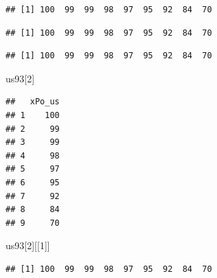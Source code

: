 \documentclass[
]{article}
\newenvironment{Shaded}{\begin{snugshade}}{\end{snugshade}}
\newcommand{\DecValTok}[1]{\textcolor[rgb]{0.00,0.00,0.81}{#1}}
\newcommand{\NormalTok}[1]{#1}
\newcommand{\SpecialCharTok}[1]{\textcolor[rgb]{0.00,0.00,0.00}{#1}}
\newcommand{\StringTok}[1]{\textcolor[rgb]{0.31,0.60,0.02}{#1}}
\begin{document}
\begin{verbatim}
## [1] 100  99  99  98  97  95  92  84  70
\end{verbatim}

\begin{Shaded}
\end{Shaded}

\begin{verbatim}
## [1] 100  99  99  98  97  95  92  84  70
\end{verbatim}

\begin{Shaded}
\end{Shaded}

\begin{verbatim}
## [1] 100  99  99  98  97  95  92  84  70
\end{verbatim}

\begin{Shaded}
\begin{Highlighting}[]
\NormalTok{us93[}\DecValTok{2}\NormalTok{]}
\end{Highlighting}
\end{Shaded}

\begin{verbatim}
##   xPo_us
## 1    100
## 2     99
## 3     99
## 4     98
## 5     97
## 6     95
## 7     92
## 8     84
## 9     70
\end{verbatim}

\begin{Shaded}
\begin{Highlighting}[]
\NormalTok{us93[}\DecValTok{2}\NormalTok{][[}\DecValTok{1}\NormalTok{]]}
\end{Highlighting}
\end{Shaded}

\begin{verbatim}
## [1] 100  99  99  98  97  95  92  84  70
\end{verbatim}

\begin{Shaded}
\end{Shaded}
\end{document}
